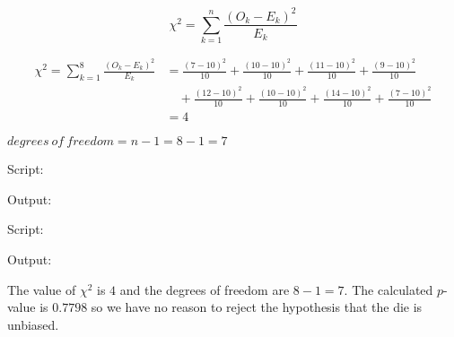 \documentclass[a4paper,11pt,openright]{report}
\begin{document}
\begin{enumerate}
\begin{equation*}
\chi^2  = \sum_{k=1}^{n} \frac{(O_k - E_k)^2}{E_k}
\end{equation*}

\begin{equation*}
\begin{split}
\chi^2 = \sum_{k=1}^{8} \frac{(O_k - E_k)^2}{E_k} & = \frac{(7 - 10)^2}{10} + \frac{(10 - 10)^2}{10} + \frac{(11 - 10)^2}{10} + \frac{(9 - 10)^2}{10} \\
&\quad + \frac{(12 - 10)^2}{10} + \frac{(10 - 10)^2}{10} + \frac{(14 - 10)^2}{10} + \frac{(7 - 10)^2}{10} \\
& = 4
\end{split}
\end{equation*}

$degrees \: of \: freedom = n - 1 = 8 - 1 = 7$

Script:


Output:


Script:


Output:


The value of $\chi^2$ is $4$ and the degrees of freedom are $8 - 1 = 7$. The calculated $p$-value is $0.7798$ so we have no reason to reject the hypothesis 
that the die is unbiased.

\end{enumerate}
\end{document}
